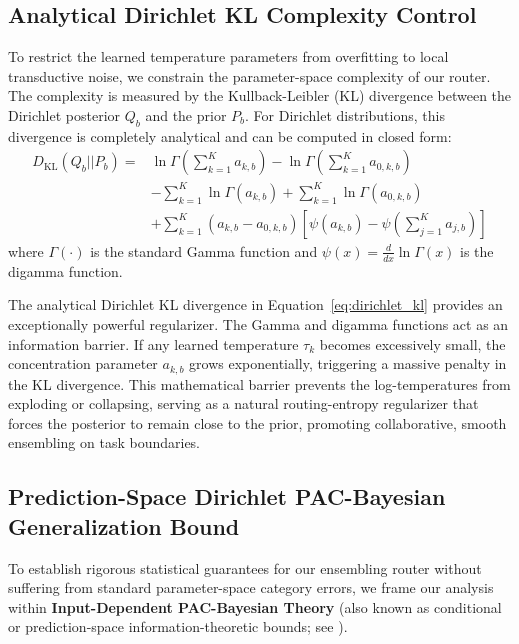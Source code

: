 \subsection{Analytical Dirichlet KL Complexity Control}
To restrict the learned temperature parameters from overfitting to local transductive noise, we constrain the parameter-space complexity of our router. The complexity is measured by the Kullback-Leibler (KL) divergence between the Dirichlet posterior $Q_b$ and the prior $P_b$. For Dirichlet distributions, this divergence is completely analytical and can be computed in closed form:
\begin{align}
  D_{\text{KL}}(Q_b || P_b) = & \ln \Gamma\left( \sum_{k=1}^K a_{k, b} \right) - \ln \Gamma\left( \sum_{k=1}^K a_{0, k, b} \right) \nonumber \\
  & - \sum_{k=1}^K \ln \Gamma(a_{k, b}) + \sum_{k=1}^K \ln \Gamma(a_{0, k, b}) \nonumber \\
  & + \sum_{k=1}^K (a_{k, b} - a_{0, k, b})\left[ \psi(a_{k, b}) - \psi\left( \sum_{j=1}^K a_{j, b} \right) \right]
  \label{eq:dirichlet_kl}
\end{align}
where $\Gamma(\cdot)$ is the standard Gamma function and $\psi(x) = \frac{d}{dx} \ln \Gamma(x)$ is the digamma function.

The analytical Dirichlet KL divergence in Equation~\eqref{eq:dirichlet_kl} provides an exceptionally powerful regularizer. The Gamma and digamma functions act as an information barrier. If any learned temperature $\tau_k$ becomes excessively small, the concentration parameter $a_{k, b}$ grows exponentially, triggering a massive penalty in the KL divergence. This mathematical barrier prevents the log-temperatures from exploding or collapsing, serving as a natural routing-entropy regularizer that forces the posterior to remain close to the prior, promoting collaborative, smooth ensembling on task boundaries.

\subsection{Prediction-Space Dirichlet PAC-Bayesian Generalization Bound}
To establish rigorous statistical guarantees for our ensembling router without suffering from standard parameter-space category errors, we frame our analysis within \textbf{Input-Dependent PAC-Bayesian Theory} (also known as conditional or prediction-space information-theoretic bounds; see \cite{lever2013tighter, negrea2019information, hellstrom2020generalization, alquier2021user}). 

